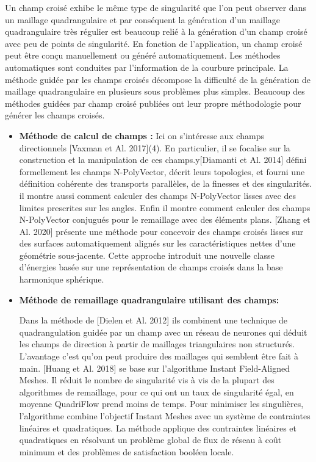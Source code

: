 \documentclass[runningheads]{llncs}
\begin{document}
Un champ croisé exhibe le même type de singularité que l’on peut observer dans un maillage quadrangulaire et par conséquent la génération d’un maillage quadrangulaire très régulier est beaucoup relié à la génération d’un champ croisé avec peu de points de singularité. En fonction de l’application, un champ croisé peut être conçu manuellement ou généré automatiquement. Les méthodes automatiques sont conduites par l’information de la courbure principale. La méthode guidée par les champs croisés décompose la difficulté de la génération de maillage quadrangulaire en plusieurs sous problèmes plus simples. Beaucoup des méthodes guidées par champ croisé publiées ont leur propre méthodologie pour générer les champs croisés.

\begin{itemize}
  \item \textbf{Méthode de calcul de champs :} Ici on s’intéresse aux champs directionnels [Vaxman et Al. 2017](4). En particulier, il se focalise sur la construction et la manipulation de ces champs.y[Diamanti et Al. 2014]\cite{https://doi.org/10.1111/cgf.12426} défini formellement les champs N-PolyVector, décrit leurs
topologies, et fourni une définition cohérente des transports parallèles, de la finesses et des singularités. il montre aussi comment calculer des champs N-PolyVector lisses
avec des limites prescrites sur les angles. Enfin il montre comment calculer des champs N-PolyVector conjugués pour le remaillage avec des éléments plans.
[Zhang et Al. 2020]\cite{https://doi.org/10.48550/arxiv.2007.09740} présente une méthode pour concevoir des champs croisés lisses sur des surfaces automatiquement alignés sur les caractéristiques nettes d'une géométrie sous-jacente. Cette approche introduit une nouvelle classe d'énergies basée sur une représentation de champs croisés dans la base harmonique sphérique.

\item \textbf{Méthode de remaillage quadrangulaire utilisant des champs:}
 
Dans la méthode de [Dielen et Al. 2012]\cite{https://doi.org/10.1111/cgf.14366} ils combinent une technique de quadrangulation guidée par un champ avec un réseau de neurones qui déduit les champs de direction à partir de maillages triangulaires non structurés. L’avantage c’est qu’on peut produire des maillages qui semblent être fait à main.
[Huang et Al. 2018]\cite{huang_quadriflow:_2018} se base sur l’algorithme Instant Field-Aligned Meshes. Il réduit le nombre de singularité vis à vis de la plupart des algorithmes de remaillage, pour ce qui ont un taux de singularité égal, en moyenne QuadriFlow prend moins de temps. Pour minimiser les singulières, l'algorithme combine l'objectif Instant Meshes avec un système de contraintes linéaires et quadratiques. La méthode applique des contraintes linéaires et quadratiques en résolvant un problème global de flux de réseau à coût minimum et des problèmes de satisfaction booléen locale.

\end{itemize}
\end{document}

